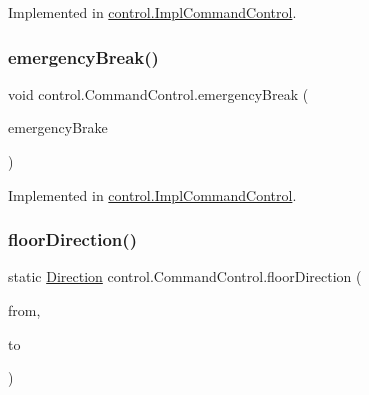 Implemented in \mbox{\hyperlink{classcontrol_1_1_impl_command_control_a992b195b4521cba044f235fa35f6a9b2}{control.\+Impl\+Command\+Control}}.

\mbox{\label{interfacecontrol_1_1_command_control_a9a32457770712105c8ceffab1c05b95a}} 
\subsubsection{\texorpdfstring{emergencyBreak()}{emergencyBreak()}}
{\footnotesize\ttfamily void control.\+Command\+Control.\+emergency\+Break (\begin{DoxyParamCaption}\item[{\mbox{\hyperlink{classcontrol_1_1command_1_1_emergency_brake}{Emergency\+Brake}}}]{emergency\+Brake }\end{DoxyParamCaption})}



Implemented in \mbox{\hyperlink{classcontrol_1_1_impl_command_control_a1a3e2202d967016c70f6c7e2105fc4c7}{control.\+Impl\+Command\+Control}}.

\mbox{\label{interfacecontrol_1_1_command_control_a22ab7945cd82bb103b59e5d3103288a3}} 
\subsubsection{\texorpdfstring{floorDirection()}{floorDirection()}}
{\footnotesize\ttfamily static \mbox{\hyperlink{enumcontrol_1_1command_1_1_direction}{Direction}} control.\+Command\+Control.\+floor\+Direction (\begin{DoxyParamCaption}\item[{int}]{from,  }\item[{int}]{to }\end{DoxyParamCaption})\hspace{0.3cm}{\ttfamily [static]}}

